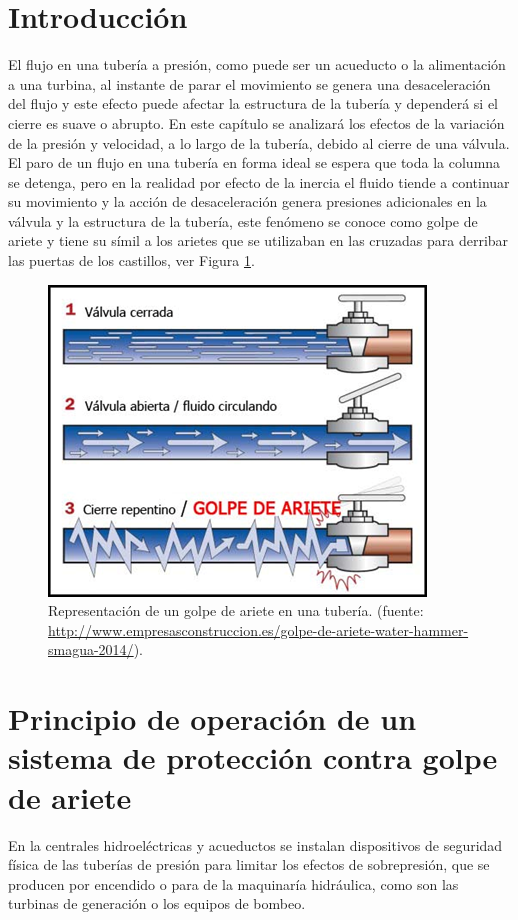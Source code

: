 \documentclass[letterpaper]{report}
\begin{document}
\section{Introducción}
El flujo en una tubería a presión, como puede ser un acueducto o la alimentación a una turbina, al instante de parar el movimiento se genera
 una desaceleración del flujo y este efecto puede afectar la estructura de la tubería y dependerá si el cierre es suave o abrupto. 
En este capítulo se analizará los efectos de la variación de la presión y velocidad, a lo largo de la tubería, debido al cierre de una válvula.
El paro de un flujo en una tubería en forma ideal se espera que toda la columna se detenga, pero en la realidad 
por efecto de la inercia el fluido tiende a continuar su movimiento y la acción de desaceleración genera presiones 
adicionales en la válvula y la estructura de la tubería, este fenómeno se conoce como golpe de ariete y tiene su símil 
a los arietes que se utilizaban en las cruzadas para derribar las puertas de los castillos, ver Figura \ref{fig:fig1}.
\begin{center}
\begin{figure}[H]
	\centering
	\includegraphics[width=0.6\linewidth]{fig1}
	\caption{Representación de un golpe de ariete en una tubería. (fuente: \url{http://www.empresasconstruccion.es/golpe-de-ariete-water-hammer-smagua-2014/}).}
	\label{fig:fig1}
\end{figure}
\end{center}

\section{Principio de operación de un sistema de protección contra golpe de ariete}
En la centrales hidroeléctricas y acueductos se instalan dispositivos de seguridad física de las tuberías de presión 
para limitar los efectos de sobrepresión, que se producen por encendido o para de la maquinaría hidráulica, como 
son las turbinas de generación o los equipos de bombeo.\bigskip
\end{document}
